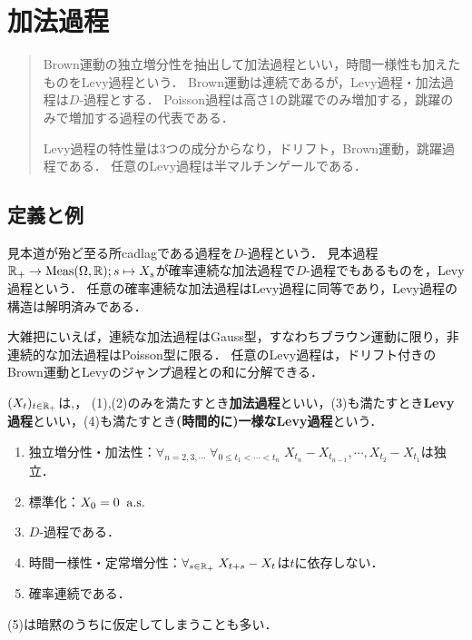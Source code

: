 \documentclass[uplatex,dvipdfmx]{jsreport}
\begin{document}
\chapter{加法過程}

\begin{quotation}
    Brown運動の独立増分性を抽出して加法過程といい，時間一様性も加えたものをLevy過程という．
    Brown運動は連続であるが，Levy過程・加法過程は$D$-過程とする．
    Poisson過程は高さ1の跳躍でのみ増加する，跳躍のみで増加する過程の代表である．

    Levy過程の特性量は3つの成分からなり，ドリフト，Brown運動，跳躍過程である．
    任意のLevy過程は半マルチンゲールである．
\end{quotation}

\section{定義と例}

\begin{tcolorbox}[colframe=ForestGreen, colback=ForestGreen!10!white,breakable,colbacktitle=ForestGreen!40!white,coltitle=black,fonttitle=\bfseries\sffamily,
    title=]
    見本道が殆ど至る所cadlagである過程を$D$-過程という．
    見本過程$\mathbb{R}_+\to\mathrm{Meas}(\Omega,\mathbb{R});s\mapsto X_s$が確率連続な加法過程で$D$-過程でもあるものを，Levy過程という．
    任意の確率連続な加法過程はLevy過程に同等であり，Levy過程の構造は解明済みである．

    大雑把にいえば，連続な加法過程はGauss型，すなわちブラウン運動に限り，非連続的な加法過程はPoisson型に限る．
    任意のLevy過程は，ドリフト付きのBrown運動とLevyのジャンプ過程との和に分解できる．
\end{tcolorbox}

\begin{definition}
    $(X_t)_{t\in\mathbb{R}_+}$は,，
    (1),(2)のみを満たすとき\textbf{加法過程}といい，(3)も満たすとき\textbf{Levy過程}といい，(4)も満たすとき\textbf{(時間的に)一様なLevy過程}という．
    \begin{enumerate}
        \item 独立増分性・加法性：$\forall_{n=2,3,\cdots}\;\forall_{0\le t_1<\cdots<t_n}\;X_{t_n}-X_{t_{n-1}},\cdots,X_{t_2}-X_{t_1}$は独立．
        \item 標準化：$X_0=0\;\;\mathrm{a.s.}$
        \item $D$-過程である．
        \item 時間一様性・定常増分性：$\forall_{s\in\mathbb{R}_+}\;X_{t+s}- X_t$は$t$に依存しない．
        \item 確率連続である．
    \end{enumerate}
    (5)は暗黙のうちに仮定してしまうことも多い．
\end{definition}
\end{document}
